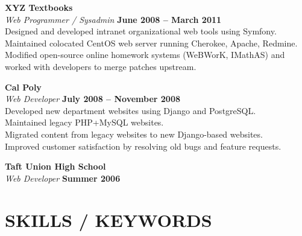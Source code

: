 \documentclass[margin,line]{resume}
\begin{document}
\begin{resume}
    \textbf{\listing XYZ Textbooks} \vspace{2mm}\\\vspace{1mm}%
    \textsl{Web Programmer / Sysadmin} \hfill \textbf{June 2008 -- March 2011}\\
    Designed and developed intranet organizational web tools using Symfony.\\
    Maintained colocated CentOS web server running Cherokee, Apache, Redmine.\\
    Modified open-source online homework systems (WeBWorK, IMathAS) and worked with developers to merge patches upstream.
    
    \textbf{\listing Cal Poly} \vspace{2mm}\\\vspace{1mm}%
    \textsl{Web Developer} \hfill \textbf{July 2008 -- November 2008}\\
    Developed new department websites using Django and PostgreSQL.\\
    Maintained legacy PHP+MySQL websites.\\
    Migrated content from legacy websites to new Django-based websites.\\
    Improved customer satisfaction by resolving old bugs and feature requests.

    \textbf{\listing Taft Union High School} \vspace{2mm}\\\vspace{1mm}%
    \textsl{Web Developer} \hfill \textbf{Summer 2006}\\

\sectionline

    \section{\mysidestyle \textbf{\large{S}\small{KILLS} / \large{K}\small{EYWORDS}}}


\end{resume}
\end{document}
